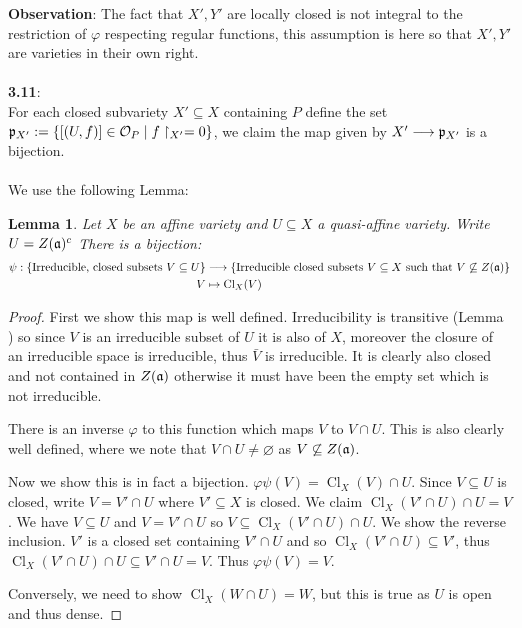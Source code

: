 \documentclass[12pt]{article}
\numberwithin{thm}{subsection}
\numberwithin{defn}{subsection}
\newtheorem{lemma}{Lemma}
\numberwithin{lemma}{subsection}
\numberwithin{example}{subsection}
\numberwithin{notation}{subsection}
\numberwithin{cor}{subsection}
\numberwithin{remark}{subsection}
\numberwithin{condition}{subsection}
\numberwithin{question}{subsection}
\numberwithin{construction}{subsection}
\numberwithin{construction}{subsection}
\numberwithin{construction}{subsection}
\newcommand{\call}[1]{\mathcal{#1}}
\newcommand{\lto}{\longrightarrow}
\begin{document}
%
\textbf{Observation}: The fact that $X',Y'$ are locally closed is not integral to the restriction of $\varphi$ respecting regular functions, this assumption is here so that $X',Y'$ are varieties in their own right.\\\\
%
\textbf{3.11}:\\
For each closed subvariety $X' \subseteq X$ containing $P$ define the set $\frak{p}_{X'} := \lbrace [(U,f)] \in \call{O}_P \mid f\restriction_{X'} = 0\rbrace$, we claim the map given by $X' \lto \frak{p}_{X'}$ is a bijection.\\\\
%
We use the following Lemma:
\begin{lemma}
\label{lem:torture}
Let $X$ be an affine variety and $U \subseteq X$ a quasi-affine variety. Write $U = Z(\frak{a})^c$ There is a bijection:
\begin{align*}
    \psi: \lbrace \text{Irreducible, closed subsets }V \subseteq U\rbrace &\lto \lbrace \text{Irreducible closed subsets }V \subseteq X\text{ such that }V \not\subseteq Z(\frak{a})\rbrace\\
    V &\mapsto \operatorname{Cl}_X(V)
\end{align*}
\end{lemma}
\begin{proof}
First we show this map is well defined. Irreducibility is transitive (Lemma \cite[\S Irreducible sets]{alggeonotes}) so since $V$ is an irreducible subset of $U$ it is also of $X$, moreover the closure of an irreducible space is irreducible, thus $\bar{V}$ is irreducible. It is clearly also closed and not contained in $Z(\frak{a})$ otherwise it must have been the empty set which is not irreducible.

There is an inverse $\varphi$ to this function which maps $V$ to $V \cap U$. This is also clearly well defined, where we note that $V \cap U \neq \varnothing$ as $V \not\subseteq Z(\frak{a})$.

Now we show this is in fact a bijection. $\varphi \psi (V) = \operatorname{Cl}_X(V) \cap U$. Since $V \subseteq U$ is closed, write $V = V' \cap U$ where $V' \subseteq X$ is closed. We claim $\operatorname{Cl}_X(V' \cap U) \cap U = V$. We have $V \subseteq U$ and $V = V' \cap U$ so $V \subseteq \operatorname{Cl}_X(V' \cap U) \cap U$. We show the reverse inclusion. $V'$ is a closed set containing $V' \cap U$ and so $\operatorname{Cl}_X(V' \cap U) \subseteq V'$, thus $\operatorname{Cl}_X(V' \cap U) \cap U \subseteq V' \cap U = V$. Thus $\varphi\psi(V) = V$.

Conversely, we need to show $\operatorname{Cl}_X(W \cap U) = W$, but this is true as $U$ is open and thus dense.
\end{proof}
\end{document}
